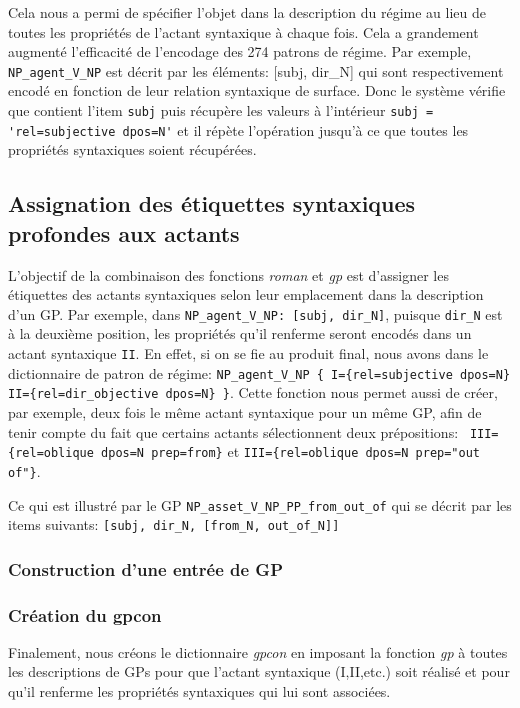 Cela nous a permi de spécifier l'objet dans la description du régime au lieu de toutes les propriétés de l'actant syntaxique à chaque fois. Cela a grandement augmenté l'efficacité de l'encodage des 274 patrons de régime. Par exemple, \lstinline|NP_agent_V_NP| est décrit par les éléments: [subj, dir\_N] qui sont respectivement encodé en fonction de leur relation syntaxique de surface. Donc le système vérifie que contient l'item \texttt{subj} puis récupère les valeurs à l'intérieur \lstinline|subj = 'rel=subjective dpos=N'| et il répète l'opération jusqu'à ce que toutes les propriétés syntaxiques soient récupérées.

\subsection{Assignation des étiquettes syntaxiques profondes aux actants}

L'objectif de la combinaison des fonctions \emph{roman} et \emph{gp} est d'assigner les étiquettes des actants syntaxiques selon leur emplacement dans la description d'un \ac{GP}. Par exemple, dans \lstinline|NP_agent_V_NP: [subj, dir_N]|, puisque \texttt{dir\_N} est à la deuxième position, les propriétés qu'il renferme seront encodés dans un actant syntaxique \texttt{II}. En effet, si on se fie au produit final, nous avons dans le dictionnaire de patron de régime: \lstinline|NP_agent_V_NP { I={rel=subjective dpos=N} II={rel=dir_objective dpos=N} }|.  Cette fonction nous permet aussi de créer, par exemple, deux fois le même actant syntaxique pour un même \ac{GP}, afin de tenir compte du fait que certains actants sélectionnent deux prépositions: \lstinline| III={rel=oblique dpos=N prep=from}| et \lstinline|III={rel=oblique dpos=N prep="out of"}|. 

Ce qui est illustré par le \ac{GP} \lstinline|NP_asset_V_NP_PP_from_out_of| qui se décrit par les items suivants: \lstinline|[subj, dir_N, [from_N, out_of_N]]|

\subsubsection{Construction d'une entrée de \ac{GP}}


\subsubsection{Création du gpcon}
Finalement, nous créons le dictionnaire \emph{gpcon} en imposant la fonction \emph{gp} à toutes les descriptions de \acp{GP} pour que l'actant syntaxique (I,II,etc.) soit réalisé et pour qu'il renferme les propriétés syntaxiques qui lui sont associées.

